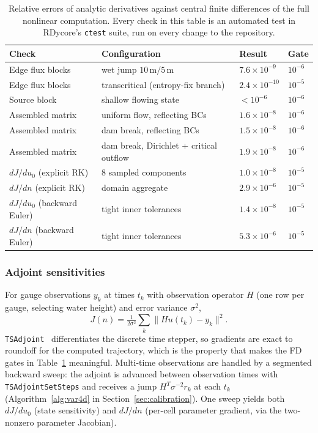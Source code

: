 \documentclass[11pt]{article}
\begin{document}
\begin{table}
\centering\small
\begin{tabular}{@{}llll@{}}
\toprule
Check & Configuration & Result & Gate \\
\midrule
Edge flux blocks & wet jump $10\,\mathrm{m}/5\,\mathrm{m}$ & $7.6\times10^{-9}$ & $10^{-6}$ \\
Edge flux blocks & transcritical (entropy-fix branch) & $2.4\times10^{-10}$ & $10^{-5}$ \\
Source block & shallow flowing state & $<10^{-6}$ & $10^{-6}$ \\
Assembled matrix & uniform flow, reflecting BCs & $1.6\times10^{-8}$ & $10^{-6}$ \\
Assembled matrix & dam break, reflecting BCs & $1.5\times10^{-8}$ & $10^{-6}$ \\
Assembled matrix & dam break, Dirichlet + critical outflow & $1.9\times10^{-8}$ & $10^{-6}$ \\
$dJ/du_0$ (explicit RK) & 8 sampled components & $1.0\times10^{-8}$ & $10^{-5}$ \\
$dJ/dn$ (explicit RK) & domain aggregate & $2.9\times10^{-6}$ & $10^{-5}$ \\
$dJ/du_0$ (backward Euler) & tight inner tolerances & $1.4\times10^{-8}$ & $10^{-5}$ \\
$dJ/dn$ (backward Euler) & tight inner tolerances & $5.3\times10^{-6}$ & $10^{-5}$ \\
\bottomrule
\end{tabular}
\caption{Relative errors of analytic derivatives against central finite
differences of the full nonlinear computation. Every check in this
table is an automated test in RDycore's \texttt{ctest} suite, run on
every change to the repository.}
\label{tab:verification}
\end{table}

\subsubsection{Adjoint sensitivities}
\label{sec:adjoint}

For gauge observations $y_k$ at times $t_k$ with observation operator
$H$ (one row per gauge, selecting water height) and error variance
$\sigma^2$,
\begin{equation}
  J(n) = \tfrac{1}{2\sigma^2} \sum_k \lVert H u(t_k) - y_k\rVert^2 .
\end{equation}
\texttt{TSAdjoint}~\cite{zhang2022tsadjoint} differentiates the discrete
time stepper, so gradients are exact to roundoff for the computed
trajectory, which is the property that makes the FD gates in
Table~\ref{tab:verification} meaningful. Multi-time observations are
handled by a segmented backward sweep: the adjoint is advanced between
observation times with \texttt{TSAdjointSetSteps} and receives a jump
$H^T\sigma^{-2} r_k$ at each $t_k$
(Algorithm~\ref{alg:var4d} in Section~\ref{sec:calibration}). One sweep yields both $dJ/du_0$
(state sensitivity) and $dJ/dn$ (per-cell parameter gradient, via the
two-nonzero parameter Jacobian).
\end{document}
